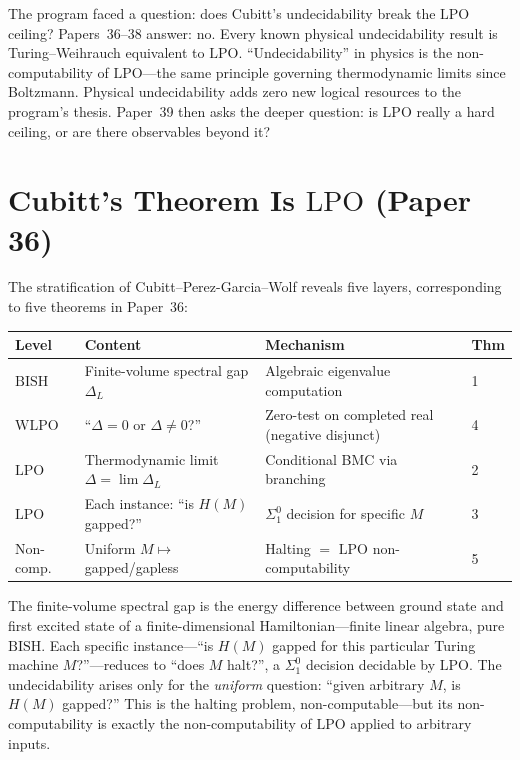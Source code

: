 \documentclass[11pt,a4paper]{report}
\theoremstyle{plain}
\theoremstyle{definition}
\theoremstyle{remark}
\newcommand{\BISH}{\mathrm{BISH}}
\newcommand{\WLPO}{\mathrm{WLPO}}
\newcommand{\LPO}{\mathrm{LPO}}
\begin{document}
The program faced a question: does Cubitt's undecidability break the $\LPO$ ceiling? Papers~36--38 answer: no. Every known physical undecidability result is Turing--Weihrauch equivalent to $\LPO$. ``Undecidability'' in physics is the non-computability of $\LPO$---the same principle governing thermodynamic limits since Boltzmann. Physical undecidability adds zero new logical resources to the program's thesis. Paper~39 then asks the deeper question: is $\LPO$ really a hard ceiling, or are there observables beyond it?

\section{Cubitt's Theorem Is $\LPO$ (Paper 36)}

The stratification of Cubitt--Perez-Garcia--Wolf reveals five layers, corresponding to five theorems in Paper~36:

{\small
\begin{center}
\begin{tabular}{@{}lp{4.5cm}p{4.5cm}l@{}}
\toprule
\textbf{Level} & \textbf{Content} & \textbf{Mechanism} & \textbf{Thm} \\
\midrule
$\BISH$ & Finite-volume spectral gap $\Delta_L$ & Algebraic eigenvalue computation & 1 \\
$\WLPO$ & ``$\Delta = 0$ or $\Delta \neq 0$?'' & Zero-test on completed real (negative disjunct) & 4 \\
$\LPO$ & Thermodynamic limit $\Delta = \lim \Delta_L$ & Conditional BMC via branching & 2 \\
$\LPO$ & Each instance: ``is $H(M)$ gapped?'' & $\Sigma^0_1$ decision for specific $M$ & 3 \\
Non-comp. & Uniform $M \mapsto$ gapped/gapless & Halting $=$ $\LPO$ non-computability & 5 \\
\bottomrule
\end{tabular}
\end{center}}

The finite-volume spectral gap is the energy difference between ground state and first excited state of a finite-dimensional Hamiltonian---finite linear algebra, pure $\BISH$. Each specific instance---``is $H(M)$ gapped for this particular Turing machine $M$?''---reduces to ``does $M$ halt?'', a $\Sigma^0_1$ decision decidable by $\LPO$. The undecidability arises only for the \emph{uniform} question: ``given arbitrary $M$, is $H(M)$ gapped?'' This is the halting problem, non-computable---but its non-computability is exactly the non-computability of $\LPO$ applied to arbitrary inputs.
\end{document}
